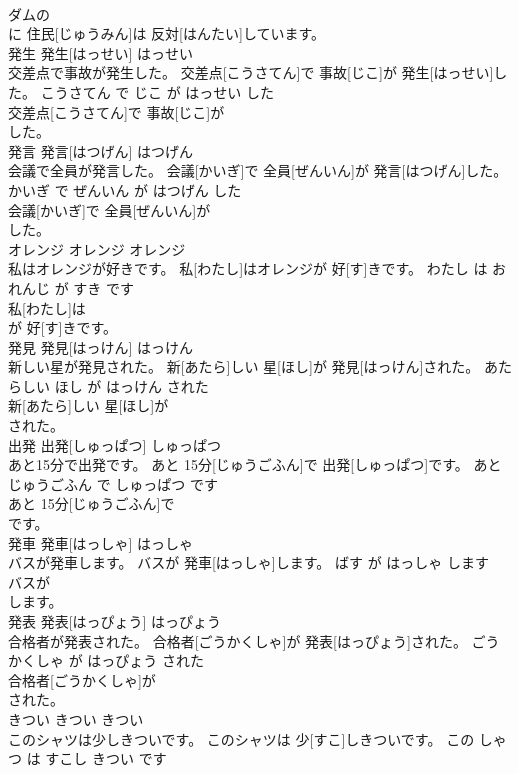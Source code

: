 \documentclass[8pt]{extreport}
\begin{document}
\begin{CJK}{UTF8}{min}
\\	ダムの
\\	に 住民[じゅうみん]は 反対[はんたい]しています。			
\\	発生	発生[はっせい]	はっせい	
\\	交差点で事故が発生した。	交差点[こうさてん]で 事故[じこ]が 発生[はっせい]した。	こうさてん で じこ が はっせい した	
\\	交差点[こうさてん]で 事故[じこ]が
\\	した。			
\\	発言	発言[はつげん]	はつげん	
\\	会議で全員が発言した。	会議[かいぎ]で 全員[ぜんいん]が 発言[はつげん]した。	かいぎ で ぜんいん が はつげん した	
\\	会議[かいぎ]で 全員[ぜんいん]が
\\	した。			
\\	オレンジ	オレンジ	オレンジ	
\\	私はオレンジが好きです。	私[わたし]はオレンジが 好[す]きです。	わたし は おれんじ が すき です	
\\	私[わたし]は
\\	が 好[す]きです。			
\\	発見	発見[はっけん]	はっけん	
\\	新しい星が発見された。	新[あたら]しい 星[ほし]が 発見[はっけん]された。	あたらしい ほし が はっけん された	
\\	新[あたら]しい 星[ほし]が
\\	された。			
\\	出発	出発[しゅっぱつ]	しゅっぱつ	
\\	あと15分で出発です。	あと 15分[じゅうごふん]で 出発[しゅっぱつ]です。	あと じゅうごふん で しゅっぱつ です	
\\	あと 15分[じゅうごふん]で
\\	です。			
\\	発車	発車[はっしゃ]	はっしゃ	
\\	バスが発車します。	バスが 発車[はっしゃ]します。	ばす が はっしゃ します	
\\	バスが
\\	します。			
\\	発表	発表[はっぴょう]	はっぴょう	
\\	合格者が発表された。	合格者[ごうかくしゃ]が 発表[はっぴょう]された。	ごうかくしゃ が はっぴょう された	
\\	合格者[ごうかくしゃ]が
\\	された。			
\\	きつい	きつい	きつい	
\\	このシャツは少しきついです。	このシャツは 少[すこ]しきついです。	この しゃつ は すこし きつい です	

\end{CJK}
\end{document}
